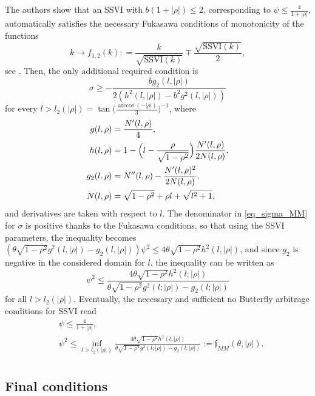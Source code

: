 \documentclass{article}
\begin{document}
The authors show that an SSVI with \(b(1+|\rho|)\leq2\), corresponding
to \(\psi\leq\frac{4}{1+|\rho|}\), automatically satisfies the necessary
Fukasawa conditions of monotonicity of the functions
\[k\to f_{1,2}(k): = \frac{k}{\sqrt{\text{SSVI}(k)}}\mp\frac{\sqrt{\text{SSVI}(k)}}2,\]
see \cite{fukasawa2012normalizing}. Then, the only additional required
condition is \begin{equation}\label{eq_sigma_MM}
\sigma\geq -\frac{bg_2(l,|\rho|)}{2(h^2(l,|\rho|)-b^2g^2(l,|\rho|))}
\end{equation} for every
\(l>l_2(|\rho|) = \tan\bigl(\frac{\arccos(-|\rho|)}{3}\bigr)^{-1}\),
where \begin{align*}
g(l,\rho) &= \frac{N'(l,\rho)}4,\\
h(l,\rho) &= 1-\Bigl(l-\frac{\rho}{\sqrt{1-\rho^2}}\Bigr)\frac{N'(l,\rho)}{2N(l,\rho)},\\
g_2(l,\rho) &= N''(l,\rho) - \frac{N'(l,\rho)^2}{2N(l,\rho)},\\
N(l,\rho) &= \sqrt{1-\rho^2}+\rho l +\sqrt{l^2+1},
\end{align*} and derivatives are taken with respect to \(l\). The
denominator in \cref{eq_sigma_MM} for \(\sigma\) is positive thanks to
the Fukasawa conditions, so that using the SSVI parameters, the
inequality becomes
\((\theta\sqrt{1-\rho^2}g^2(l,|\rho|)-g_2(l,|\rho|))\psi^2\leq 4\theta\sqrt{1-\rho^2} h^2(l,|\rho|)\),
and since \(g_2\) is negative in the considered domain for \(l\), the
inequality can be written as
\[\psi^2\leq \frac{4\theta\sqrt{1-\rho^2}h^2(l;|\rho|)}{\theta\sqrt{1-\rho^2}g^2(l;|\rho|)-g_2(l;|\rho|)}\]
for all \(l>l_2(|\rho|)\). Eventually, the necessary and sufficient no
Butterfly arbitrage conditions for SSVI read \begin{align*}
&\psi\leq\frac{4}{1+|\rho|},\\
&\psi^2 \leq \inf_{l>l_2(|\rho|)}\frac{4\theta\sqrt{1-\rho^2}h^2(l;|\rho|)}{\theta\sqrt{1-\rho^2}g^2(l;|\rho|)-g_2(l;|\rho|)} := \mathfrak f_{MM}(\theta,|\rho|).\\
\end{align*}

	\hypertarget{final-conditions}{%
\subsection{Final conditions}\label{final-conditions}}
\end{document}
